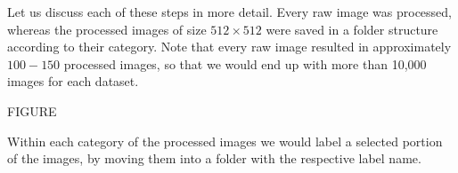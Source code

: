Let us discuss each of these steps in more detail. Every raw image was processed, whereas the processed images of size $512\times512$ were saved in a folder structure according to their category. Note that every raw image resulted in approximately $100 - 150$ processed images, so that we would end up with more than 10,000 images for each dataset.

FIGURE


Within each category of the processed images we would label a selected portion of the images, by moving them into a folder with the respective label name.






